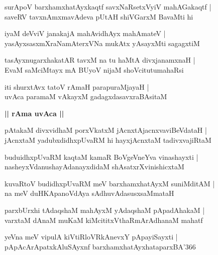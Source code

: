 \documentclass[twoside,12pt,openright]{book}
\newcounter{shloka}[chapter]
\def\uvaca#1{\centerline{{\large\textbf{#1}}}}
\begin{document}
\begin{shloka}%
surApoV barxhamxhatAyxkaqtf savxNaRsetxVyiV mahAGakaqtf |\\
saveRV tavxnAmxmavAdeva pUtAH shiVGarxM BavaMti hi
\end{shloka}

\begin{shloka}%
iyaM deVviV janakajA mahAvidhAyx mahAmateV |\\
yasAyxsasxmXraNamAterxVNa mukAtx yAsayxMti sagagxtiM  
\end{shloka}

\begin{shloka}%
tasAyxnugarxhakatAR tavxM na tu haMtA divxjanamxnaH |\\
EvaM saMciMtayx mA BUyoV nijaM shoVcitutumahaRsi 
\end{shloka}

\begin{shloka}%
iti shurxtAvx tatoV rAmaH parapuraMjayaH |\\
uvAca paramaM vAkayxM gadagxdasavxraBAsitaM 
\end{shloka}

\uvaca{|| rAma uvAca ||}

\begin{shloka}%
pAtakaM divxvidhaM porxVkatxM jAcnxtAjacnxvaviBeVdataH |\\
jAcnxtaM yadubxdidhxpUvaRM hi hayxjAcnxtaM tadivxvajiRtaM 
\end{shloka}

\begin{shloka}%
buduidhxpUvaRM kaqtaM kamaR BoVgeVneYva vinashayxti |\\
nasheyxVdanushayAdanayxdidaM shAsatxrXvinishicxtaM 
\end{shloka}

\begin{shloka}%
kuvaRtoV budidhxpUvaRM meV barxhamxhatAyxM suniMditAM |\\
na meV duHKApanoVdAya sAdhuvAdasusxsaMmataH 
\end{shloka}

\begin{shloka}%
parxbUrxhi tAdaqshaM mahAyxM yAdaqshaM pApadAhakaM |\\
varxtaM dAnaM muKaM kiMcititxVthaRmArAdhanaM mahatf 
\end{shloka}

\begin{shloka}%
yeVna meV vipulA kiVtiRloVRkAnevxY pApayiSayxti |\\
pApAcArApatxkAluSAyxnf barxhamxhatAyxhataparxBA\char'366
\end{shloka}
\end{document}
